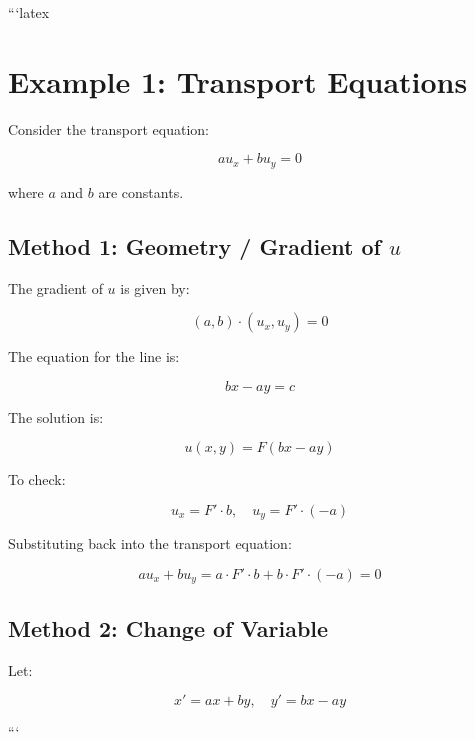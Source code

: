 ```latex
\section*{Example 1: Transport Equations}

Consider the transport equation:

\begin{equation}
    a u_x + b u_y = 0
\end{equation}

where \(a\) and \(b\) are constants.

\subsection*{Method 1: Geometry / Gradient of \(u\)}

The gradient of \(u\) is given by:

\[
(a, b) \cdot (u_x, u_y) = 0
\]

The equation for the line is:

\begin{equation}
    bx - ay = c
\end{equation}

The solution is:

\[
u(x, y) = F(bx - ay)
\]

To check:

\[
u_x = F' \cdot b, \quad u_y = F' \cdot (-a)
\]

Substituting back into the transport equation:

\[
a u_x + b u_y = a \cdot F' \cdot b + b \cdot F' \cdot (-a) = 0
\]

\subsection*{Method 2: Change of Variable}

Let:

\[
x' = ax + by, \quad y' = bx - ay
\]

```
